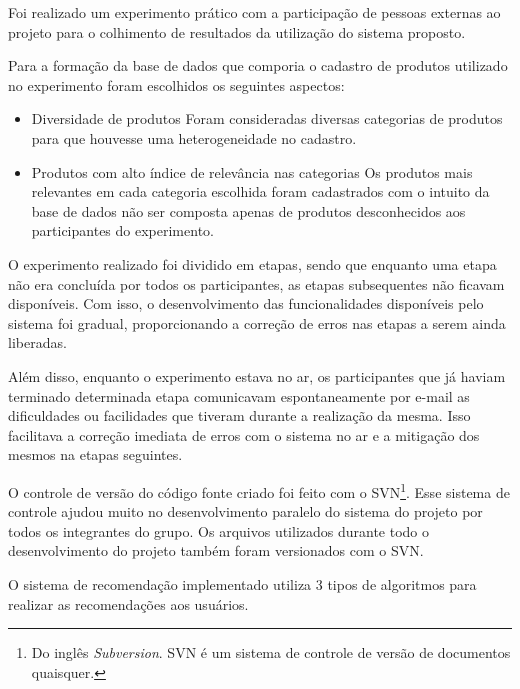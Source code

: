  Foi realizado um experimento prático com a participação de pessoas externas ao projeto para o colhimento de resultados da utilização do sistema proposto.

 Para a formação da base de dados que comporia o cadastro de produtos utilizado no experimento foram escolhidos os seguintes aspectos:

\begin{itemize}
	\item Diversidade de produtos
	\subitem Foram consideradas diversas categorias de produtos para que houvesse uma heterogeneidade no cadastro.
	\item Produtos com alto índice de relevância nas categorias
	\subitem Os produtos mais relevantes em cada categoria escolhida foram cadastrados com o intuito da base de dados não ser composta apenas de produtos desconhecidos aos participantes do experimento.
\end{itemize}

 O experimento realizado foi dividido em etapas, sendo que enquanto uma etapa não era concluída por todos os participantes, as etapas subsequentes não ficavam disponíveis. Com isso, o desenvolvimento das funcionalidades disponíveis pelo sistema foi gradual, proporcionando a correção de erros nas etapas a serem ainda liberadas.

 Além disso, enquanto o experimento estava no ar, os participantes que já haviam terminado determinada etapa comunicavam espontaneamente por e-mail as dificuldades ou facilidades que tiveram durante a realização da mesma. Isso facilitava a correção imediata de erros com o sistema no ar e a mitigação dos mesmos na etapas seguintes.

 O controle de versão do código fonte criado foi feito com o SVN\footnote{Do inglês \textit{Subversion}. SVN é um sistema de controle de versão de documentos quaisquer.}. Esse sistema de controle ajudou muito no desenvolvimento paralelo do sistema do projeto por todos os integrantes do grupo. Os arquivos utilizados durante todo o desenvolvimento do projeto também foram versionados com o SVN.

 O sistema de recomendação implementado utiliza 3 tipos de algoritmos para realizar as recomendações aos usuários.

